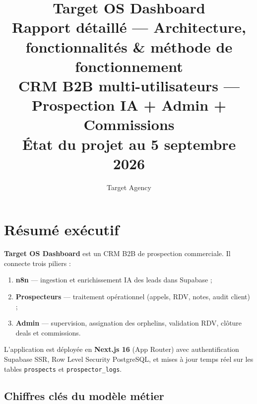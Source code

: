 \documentclass[11pt,a4paper]{report}
\begin{document}
\title{
  \vspace{1.5cm}
  {\Huge\textbf{Target OS Dashboard}}\\[0.6cm]
  {\LARGE Rapport détaillé --- Architecture, fonctionnalités \& méthode de fonctionnement}\\[0.4cm]
  {\large CRM B2B multi-utilisateurs --- Prospection IA + Admin + Commissions}\\[0.8cm]
  {\normalsize État du projet au 5 septembre 2026}
}
\author{Target Agency}
\date{}
\maketitle
\thispagestyle{empty}

\tableofcontents
\newpage

\chapter{Résumé exécutif}

\textbf{Target OS Dashboard} est un CRM B2B de prospection commerciale. Il connecte trois piliers :

\begin{enumerate}[noitemsep]
  \item \textbf{n8n} --- ingestion et enrichissement IA des leads dans Supabase ;
  \item \textbf{Prospecteurs} --- traitement opérationnel (appels, RDV, notes, audit client) ;
  \item \textbf{Admin} --- supervision, assignation des orphelins, validation RDV, clôture deals et commissions.
\end{enumerate}

L'application est déployée en \textbf{Next.js 16} (App Router) avec authentification Supabase SSR, Row Level Security PostgreSQL, et mises à jour temps réel sur les tables \texttt{prospects} et \texttt{prospector\_logs}.

\section{Chiffres clés du modèle métier}
\end{document}
